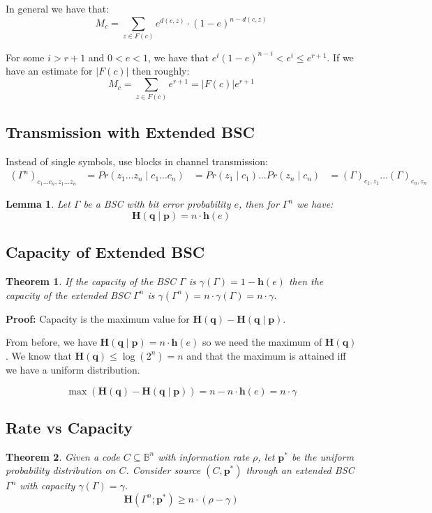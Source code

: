 \documentclass[11pt]{article}
\newtheorem{theo}{Theorem}
\newtheorem{lem}{Lemma}
\begin{document}
In general we have that:
\[
  M_c = \sum_{z \in F(c)} e^{d(c, z)} \cdot (1 - e)^{n - d(c, z)}
\]

For some $i > r + 1$ and $0 < e < 1$, we have that $e^i (1 - e)^{n - i} < e^i \leq e^{r + 1}$.
If we have an estimate for $\lvert F (c) \rvert$ then roughly:
\[
  M_c = \sum_{z \in F(c)} e^{r + 1} = \lvert F(c) \rvert e^{r + 1}
\]

\subsection{Transmission with Extended BSC}
Instead of single symbols, use blocks in channel transmission:
\begin{align*}
  (\Gamma^n)_{c_1 \ldots c_n, z_1 \ldots z_n} &= Pr(z_1 \ldots z_n \mid c_1 \ldots c_n)
  &= Pr(z_1 \mid c_1) \ldots Pr(z_n \mid c_n)
  &= (\Gamma)_{c_1, z_1} \ldots (\Gamma)_{c_n, z_n}
\end{align*}

\begin{lem}
  Let $\Gamma$ be a BSC with bit error probability $e$, then for $\Gamma^n$ we have:
  \[
    \textbf{H}(\textbf{q} \mid \textbf{p}) = n \cdot \textbf{h}(e)
  \]
\end{lem}

\subsection{Capacity of Extended BSC}
\begin{theo}
  If the capacity of the BSC $\Gamma$ is $\gamma(\Gamma) = 1 - \textbf{h}(e)$ then the capacity of the extended BSC $\Gamma^n$ is $\gamma(\Gamma^n) = n \cdot \gamma(\Gamma) = n \cdot \gamma$.
\end{theo}

\textbf{Proof:}
Capacity is the maximum value for $\textbf{H} (\textbf{q}) - \textbf{H}(\textbf{q} \mid \textbf{p})$.

From before, we have $\textbf{H}(\textbf{q} \mid \textbf{p}) = n \cdot \textbf{h}(e)$ so we need the maximum of $\textbf{H} (\textbf{q})$.
We know that $\textbf{H} (\textbf{q}) \leq \log(2^n) = n$ and that the maximum is attained iff we have a uniform distribution.

\[
  \max(\textbf{H} (\textbf{q}) - \textbf{H}(\textbf{q} \mid \textbf{p})) = n - n \cdot \textbf{h}(e) = n \cdot \gamma
\]

\subsection{Rate vs Capacity}
\begin{theo}
  Given a code $C \subseteq \mathbb{B}^n$ with information rate $\rho$, let $\textbf{p}^*$ be the uniform probability distribution on $C$.
  Consider source $(C, \textbf{p}^*)$ through an extended BSC $\Gamma^n$ with capacity $\gamma(\Gamma) = \gamma$.
  \[
    \textbf{H}(\Gamma^n ; \textbf{p}^*) \geq n \cdot (\rho - \gamma)
  \]
\end{theo}
\end{document}
